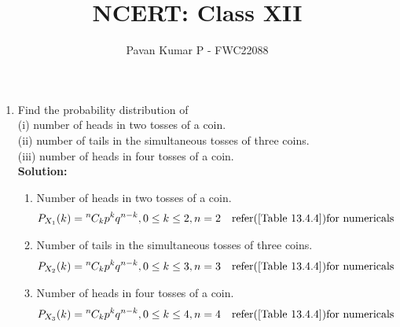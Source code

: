 \documentclass{article}
\newcommand{\solution}{\noindent \textbf{Solution: }}
\newcommand*{\permcomb}[4][0mu]{{{}^{#3}\mkern#1#2_{#4}}}
\newcommand*{\comb}[1][-1mu]{\permcomb[#1]{C}}
\begin{document}
\title{NCERT: Class XII}
\author{\Large Pavan Kumar P - FWC22088}
\date{}

\maketitle

\begin{enumerate}[label=13.\arabic{enumi}.\arabic{enumii}]

\setcounter{enumi}{3}
\setcounter{enumii}{4}

\item Find the probability distribution of\\
(i) number of heads in two tosses of a coin.\\
(ii) number of tails in the simultaneous tosses of three coins.\\
(iii) number of heads in four tosses of a coin.\\[1ex]
\solution
\begin{enumerate} 

\begin{table}[h]
 \centering
	
	\caption{Variable Description }
	\label{Table 13.4.4}
\end{table}
\item Number of heads in two tosses of a coin.\\
 \begin{align}
  P_{X_1}(k) &= \comb{n}{k}p^{k}q^{n-k},  0\leq k\leq 2,n=2& \text{refer(\ref{Table 13.4.4})for numericals}
\end{align}

\item Number of tails in the simultaneous tosses of three coins.\\
 \begin{align}
  P_{X_2}(k) &= \comb{n}{k}p^{k}q^{n-k},  0\leq k\leq 3,n=3 & \text{refer(\ref{Table 13.4.4})for numericals}            
\end{align}

\item Number of heads in four tosses of a coin.\\
 \begin{align}
  P_{X_3}(k) &= \comb{n}{k}p^{k}q^{n-k},  0\leq k\leq 4,n=4& \text{refer(\ref{Table 13.4.4})for numericals}            
\end{align}

\end{enumerate}
\end{enumerate}
\end{document}
